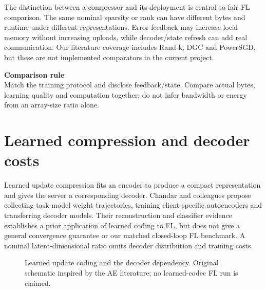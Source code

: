 The distinction between a compressor and its deployment is central to fair FL comparison. The same nominal sparsity or rank can have different bytes and runtime under different representations. Error feedback may increase local memory without increasing uploads, while decoder/state refresh can add real communication. Our literature coverage includes Rand-k, DGC and PowerSGD, but these are not implemented comparators in the current project.

\begin{reviewcallout}\textbf{Comparison rule}\\Match the training protocol and disclose feedback/state. Compare actual bytes, learning quality and computation together; do not infer bandwidth or energy from an array-size ratio alone.\end{reviewcallout}

\section{Learned compression and decoder costs}

Learned update compression fits an encoder to produce a compact representation and gives the server a corresponding decoder. Chandar and colleagues propose collecting task-model weight trajectories, training client-specific autoencoders and transferring decoder models. Their reconstruction and classifier evidence establishes a prior application of learned coding to FL, but does not give a general convergence guarantee or our matched closed-loop FL benchmark. A nominal latent-dimensional ratio omits decoder distribution and training costs. \parencite{chandar2021autoencoder}

\begin{figure}[htbp]\centering
{}
\caption{Learned update coding and the decoder dependency. Original schematic inspired by the AE literature; no learned-codec FL run is claimed.}
\label{fig:learned}
\end{figure}

